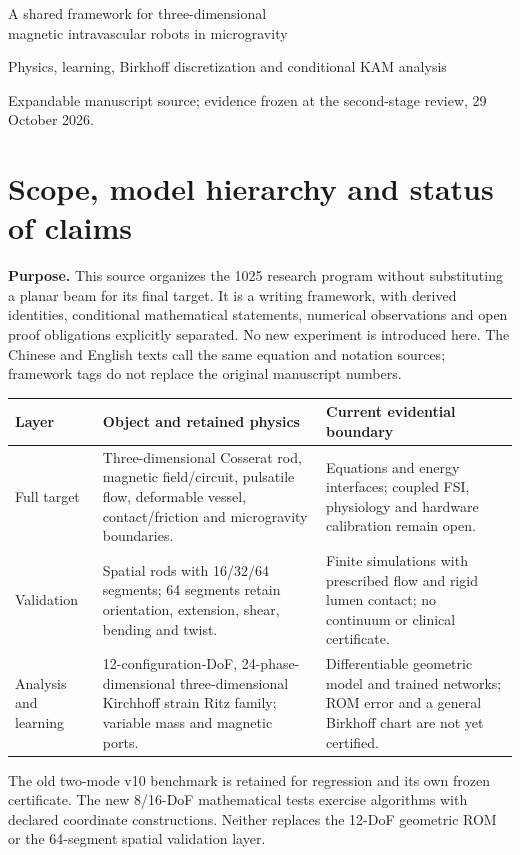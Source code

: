 {\LARGE\bfseries\sffamily\color{inkblue}\raggedright A shared framework for three-dimensional\\ magnetic intravascular robots in microgravity\par}
\vspace{.5em}
{\large Physics, learning, Birkhoff discretization and conditional KAM analysis\par}
{\small Expandable manuscript source; evidence frozen at the second-stage review, 29 October 2026.}

\section{Scope, model hierarchy and status of claims}
\textbf{Purpose.} This source organizes the 1025 research program without substituting a planar beam for its final target. It is a writing framework, with derived identities, conditional mathematical statements, numerical observations and open proof obligations explicitly separated. No new experiment is introduced here. The Chinese and English texts call the same equation and notation sources; framework tags do not replace the original manuscript numbers.

\begin{tabularx}{\textwidth}{@{}P{.22\textwidth}XX@{}}
\toprule
Layer & Object and retained physics & Current evidential boundary\\
\midrule
Full target & Three-dimensional Cosserat rod, magnetic field/circuit, pulsatile flow, deformable vessel, contact/friction and microgravity boundaries. & Equations and energy interfaces; coupled FSI, physiology and hardware calibration remain open.\\
Validation & Spatial rods with 16/32/64 segments; 64 segments retain orientation, extension, shear, bending and twist. & Finite simulations with prescribed flow and rigid lumen contact; no continuum or clinical certificate.\\
Analysis and learning & 12-configuration-DoF, 24-phase-dimensional three-dimensional Kirchhoff strain Ritz family; variable mass and magnetic ports. & Differentiable geometric model and trained networks; ROM error and a general Birkhoff chart are not yet certified.\\
\bottomrule
\end{tabularx}

The old two-mode v10 benchmark is retained for regression and its own frozen certificate. The new 8/16-DoF mathematical tests exercise algorithms with declared coordinate constructions. Neither replaces the 12-DoF geometric ROM or the 64-segment spatial validation layer.

